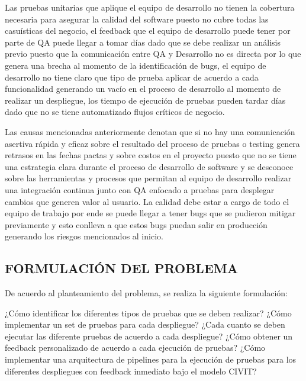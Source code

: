 Las pruebas unitarias que aplique el equipo de desarrollo no tienen la cobertura necesaria para asegurar la calidad del software puesto no cubre todas las casuísticas del negocio, el feedback que el equipo de desarrollo puede tener por parte de QA puede llegar a tomar días dado que se debe realizar un análisis previo puesto que la comunicación entre QA y Desarrollo no es directa por lo que genera una brecha al momento de la identificación de bugs, el equipo de desarrollo no tiene claro que tipo de prueba aplicar de acuerdo a cada funcionalidad generando un vacío en el proceso de desarrollo al momento de realizar un despliegue, los tiempo de ejecución de pruebas pueden tardar días dado que no se tiene automatizado flujos críticos de negocio.

Las causas mencionadas anteriormente denotan que si no hay una comunicación  asertiva rápida y eficaz sobre el resultado del proceso de pruebas o testing genera retrasos en las fechas pactas y sobre costos en el proyecto puesto que no se tiene una estrategia clara durante el proceso de desarrollo de software y se desconoce sobre las herramientas y procesos que permitan al equipo de desarrollo realizar una integración continua junto con QA enfocado a pruebas para desplegar cambios que generen valor al usuario. La calidad debe estar a cargo de todo el equipo de trabajo por ende se puede llegar a tener bugs que se pudieron mitigar previamente y esto conlleva a que estos bugs puedan salir en producción generando los riesgos mencionados al inicio.

\subsection{FORMULACIÓN DEL PROBLEMA}
De acuerdo al planteamiento del problema, se realiza la siguiente formulación:

¿Cómo identificar los diferentes tipos de pruebas que se deben realizar?
¿Cómo implementar un set de pruebas para cada despliegue?
¿Cada cuanto se deben ejecutar las diferente pruebas de acuerdo a cada despliegue?
¿Cómo obtener un feedback personalizado de acuerdo a cada ejecución de pruebas?
¿Cómo implementar una arquitectura de pipelines para la ejecución de pruebas para los diferentes despliegues con feedback inmediato bajo el modelo CIVIT?
